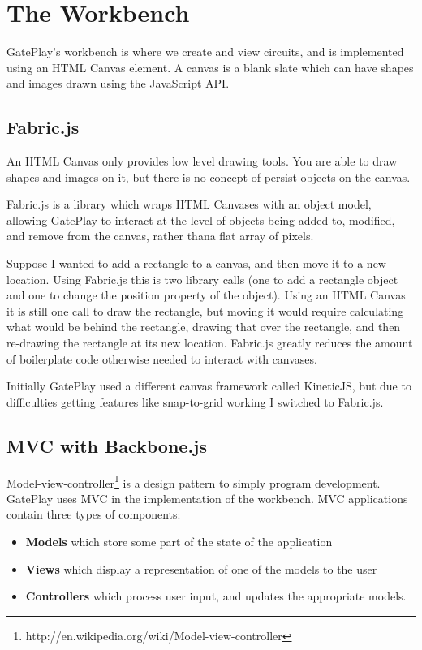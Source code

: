 \section{The Workbench}

GatePlay's workbench is where we create and view circuits, and is implemented using an HTML Canvas element. A canvas is a blank slate which can have shapes and images drawn using the JavaScript API.


\subsection{Fabric.js}
An HTML Canvas only provides low level drawing tools. You are able to draw shapes and images on it, but there is no concept of persist objects on the canvas.

Fabric.js is a library which wraps HTML Canvases with an object model, allowing GatePlay to interact at the level of objects being added to, modified, and remove from the canvas, rather thana  flat array of pixels.

Suppose I wanted to add a rectangle to a canvas, and then move it to a new location. Using Fabric.js this is two library calls (one to add a rectangle object and one to change the position property of the object). Using an HTML Canvas it is still one call to draw the rectangle, but moving it would require calculating what would be behind the rectangle, drawing that over the rectangle, and then re-drawing the rectangle at its new location. Fabric.js greatly reduces the amount of boilerplate code otherwise needed to interact with canvases.

Initially GatePlay used a different canvas framework called KineticJS, but due to difficulties getting features like snap-to-grid working I switched to Fabric.js.

\subsection{MVC with Backbone.js}
Model-view-controller\footnote{http://en.wikipedia.org/wiki/Model-view-controller} is a design pattern to simply program development. GatePlay uses MVC in the implementation of the workbench. MVC applications contain three types of components:

\begin{itemize}
	\item \textbf{Models} which store some part of the state of the application
	\item \textbf{Views} which display a representation of one of the models to the user
	\item \textbf{Controllers} which process user input, and updates the appropriate models.
\end{itemize}

